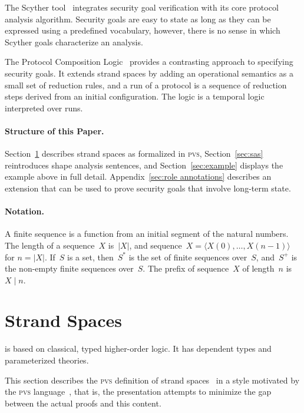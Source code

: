 \documentclass[titlepage,12pt]{article}
\newcommand{\pvs}{\textsc{pvs}}
\newcommand{\seq}[1]{\ensuremath{\langle#1\rangle}}
\newcommand{\prefix}[2]{#1\mid#2}
\begin{document}
The Scyther tool~\cite{cremers06} integrates security goal
verification with its core protocol analysis algorithm.  Security
goals are easy to state as long as they can be expressed using a
predefined vocabulary, however, there is no sense in which Scyther
goals characterize an analysis.

The Protocol Composition Logic~\cite{datta05} provides a contrasting
approach to specifying security goals.  It extends strand spaces by
adding an operational semantics as a small set of reduction rules, and
a run of a protocol is a sequence of reduction steps derived from an
initial configuration.  The logic is a temporal logic interpreted over
runs.

\paragraph{Structure of this Paper.}

Section~\ref{sec:strand spaces} describes strand spaces as formalized
in {\pvs}, Section~\ref{sec:sas} reintroduces shape analysis
sentences, and Section~\ref{sec:example} displays the example above in
full detail.  Appendix~\ref{sec:role annotations} describes an
extension that can be used to prove security goals that involve
long-term state.

\paragraph{Notation.}

A finite sequence is a function from an initial segment of the natural
numbers.  The length of a sequence~$X$ is~$|X|$, and
sequence~$X=\seq{X(0),\ldots, X(n-1)}$ for $n=|X|$.  If~$S$ is a set,
then~$S^\ast$ is the set of finite sequences over~$S$, and~$S^+$ is the
non-empty finite sequences over~$S$.  The prefix of sequence~$X$ of
length~$n$ is~$\prefix{X}{n}$.

\section{Strand Spaces}\label{sec:strand spaces}

\index{PVS@\pvs}{\pvs} is based on classical, typed higher-order
logic.  It has dependent types and parameterized theories.

This section describes the {\pvs} definition of strand
spaces~\cite{ThayerEtal99} in a style motivated by the {\pvs}
language~\cite{cade92-pvs}, that is, the presentation attempts to
minimize the gap between the actual proofs and this content.
\end{document}
